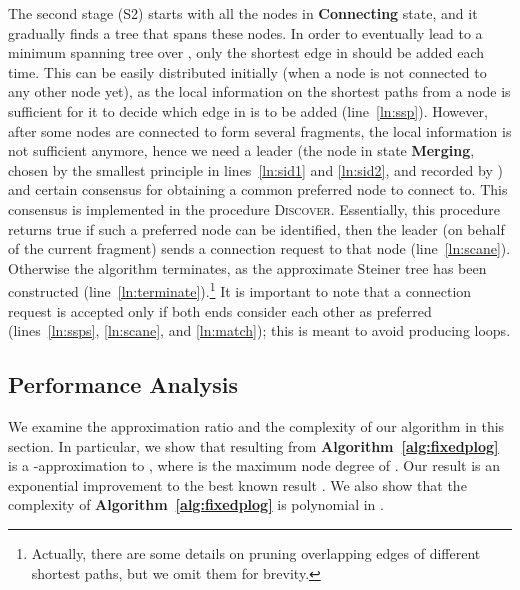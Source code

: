 \documentclass[10pt, conference, compsocconf]{IEEEtran}
\begin{document}
    The second stage (S2) starts with all the nodes in \textbf{Connecting} state, and it gradually finds a tree that spans these nodes. In order to eventually lead to a minimum spanning tree over , only the shortest edge in  should be added each time. This can be easily distributed initially (when a node is not connected to any other node yet), as the local information on the shortest paths from a node is sufficient for it to decide which edge in  is to be added (line~\ref{ln:ssp}). However, after some nodes are connected to form several fragments, the local information is not sufficient anymore, hence we need a leader (the node in state \textbf{Merging}, chosen by the smallest  principle in lines~\ref{ln:sid1} and \ref{ln:sid2}, and recorded by ) and certain consensus for obtaining a common preferred node to connect to. This consensus is implemented in the procedure \textsc{Discover}. Essentially, this procedure returns true if such a preferred node can be identified, then the leader (on behalf of the current fragment) sends a connection request to that node (line~\ref{ln:scane}). Otherwise the algorithm terminates, as the approximate Steiner tree has been constructed (line~\ref{ln:terminate}).\footnote{Actually, there are some details on pruning overlapping edges of different shortest paths, but we omit them for brevity.} It is important to note that a connection request is accepted only if both ends consider each other as preferred (lines~\ref{ln:ssps}, \ref{ln:scane}, and \ref{ln:match}); this is meant to avoid producing loops.

  \subsection{Performance Analysis} \label{sec:perf1}
We examine the approximation ratio and the complexity of our algorithm in this section. In particular, we show that  resulting from \textbf{Algorithm~\ref{alg:fixedplog}} is a -approximation to , where  is the maximum node degree of . Our result is an exponential improvement to the best known result \cite{Liang2009}. We also show that the complexity of \textbf{Algorithm~\ref{alg:fixedplog}} is polynomial in .
\end{document}

